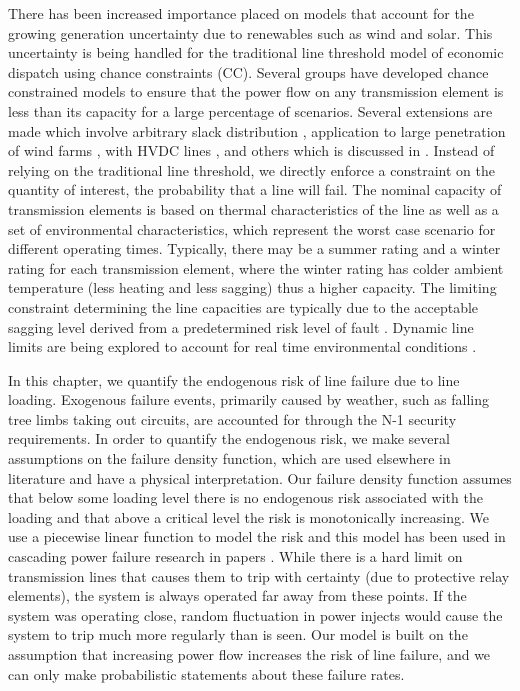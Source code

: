 There has been increased importance placed on models that account for the growing generation uncertainty due to renewables such as wind and solar.  This uncertainty is being  handled for the traditional line threshold model of economic dispatch using chance constraints (CC).  Several groups have developed chance constrained models to ensure that the power flow on any transmission element is less than its capacity for a large percentage of scenarios.  Several extensions are made which involve arbitrary slack distribution \cite{bienstock_2012}, application to large penetration of wind farms \cite{vrakopoulou_2013b}, with HVDC lines \cite{vrakopoulou_2013}, and others \cite{roald_2013,vrakopoulou_2013c} which is discussed in .  Instead of relying on the traditional line threshold, we directly enforce a constraint on the quantity of interest, the probability that a line will fail. The nominal capacity of transmission elements is based on thermal characteristics of the line as well as a set of environmental characteristics, which represent the worst case scenario for different operating times.  Typically, there may be a summer rating and a winter rating for each transmission element, where the winter rating has colder ambient temperature (less heating and less sagging) thus a higher capacity.  The limiting constraint determining the line capacities are typically due to the acceptable sagging level derived from a predetermined risk level of fault \cite{seppa_2007}.  Dynamic line limits are being explored to account for real time environmental conditions \cite{bucher_2013,wang_2011,yip_2009,zhang_2002}.  

In this chapter, we quantify the endogenous risk of line failure due to line loading.  Exogenous failure events, primarily caused by weather, such as falling tree limbs taking out circuits, are accounted for through the N-1 security requirements.  In order to quantify the endogenous risk, we make several assumptions on the failure density function, which are used elsewhere in literature and have a physical interpretation.  Our failure density function assumes that below some loading level there is no endogenous risk associated with the loading and that above a critical level the risk is monotonically increasing.  We use a piecewise linear function to model the risk and this model has been used in cascading power failure research in papers \cite{carreras_2002,chen_2005,dobson_2007,hines_2011,newman_2011}.  While there is a hard limit on transmission lines that causes them to trip with certainty (due to protective relay elements), the system is always operated far away from these points.  If the system was operating close, random fluctuation in power injects would cause the system to trip much more regularly than is seen.  Our model is built on the assumption that increasing power flow increases the risk of line failure, and we can only make probabilistic statements about these failure rates. 


